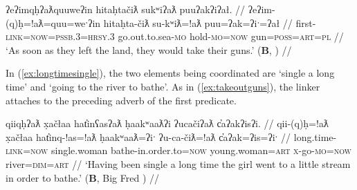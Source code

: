 \ex \label{ex:takeoutguns}
\begingl
\glpreamble ʔeʔimqḥʔaƛquuweʔin hitaḥtačiƛ sukʷiʔaƛ puuʔakʔiʔał. //
\gla ʔeʔim-(q)ḥ=!aƛ=quu=weˑʔin hitaḥta-čiƛ su-kʷiƛ=!aƛ puu=ʔak=ʔiˑ=ʔał //
\glb first-\textsc{link}=\textsc{now}=\textsc{pssb.3}=\textsc{hrsy.3} go.out.to.sea-\textsc{mo} hold-\textsc{mo}=\textsc{now} gun=\textsc{poss}=\textsc{art}=\textsc{pl} //
\glft `As soon as they left the land, they would take their guns.' (\textbf{B}, \citealt[395]{sapir1955}) //
\endgl
\xe

\begin{comment}
In (\ref{stillatwar}), the linker again attaches to an adverb \textit{ʔiiqḥii} `still', and links the entire predicate `still doing war' to the earlier predicate \textit{qʷis} `do thus.'

\ex \label{stillatwar}
\begingl
\glpreamble qiiḥsn̓aakck̓in ʔaḥ qʷiyiič qʷis, [ʔiiqḥii\textbf{qḥ} hitačink maatmaasʔi] [qaḥsaap̓aƛquuweʔin č̓amuʔałʔaƛquu yuułuʔiłʔatqḥ huuʕiiʔatḥuʔałʔaƛquu]]. //
\gla qiiḥsn̓aak-ck̓in ʔaḥ qʷiyi=(y)ii=č [[qʷis] [ʔiiqḥii-\textbf{(q)ḥ} hitačink maatmaas=ʔiˑ]] qaḥ-saˑp=!aƛ=quu=weˑʔin  č̓am-uʔał=!aƛ=quu yuułuʔiłʔatḥ-(q)ḥ huuʕiiʔatḥ-uʔał=!aƛ=quu. //
\glb long.time-\textsc{dim} \textsc{d1} when=\textsc{weak.3}=\textsc{hrsy} do.thus still-\text{link} go.against tribe.\textsc{pl}=\textsc{art} kill-\textsc{mo.caus}=\textsc{now}=\textsc{pssb.3}=\textsc{hrsy.3} canoe-see=\textsc{now}=\textsc{pssb.3} Ucluelet-\textsc{link} Huuayaht-see=\textsc{pssb.3}=\textsc{hrsy.3} //
\glft `For a little longer after this happened, while the tribes were still at war, the Ucluelets would kill Huu-ay-ahts when they saw their canoes.' (\textbf{B}, \citealt[392]{sapir1955}) //
\endgl
\xe
\end{comment}

In (\ref{ex:longtimesingle}), the two elements being coordinated are `single a long time' and `going to the river to bathe'. As in (\ref{ex:takeoutguns}), the linker attaches to the preceding adverb of the first predicate.

\ex \label{ex:longtimesingle}
\begingl
\glpreamble qiiqḥʔaƛ x̣ačłaa hat̓inʕasʔaƛ ḥaakʷaaƛʔi ʔucačiʔaƛ c̓aʔakʔisʔi. //
\gla qii-(q)ḥ=!aƛ x̣ačłaa hat̓inq-!as=!aƛ ḥaakʷaaƛ=ʔiˑ ʔu-ca-čiƛ=!aƛ c̓aʔak=ʔis=ʔiˑ //
\glb long.time-\textsc{link}=\textsc{now} single.woman bathe-in.order.to=\textsc{now} young.woman=\textsc{art} \textsc{x}-go-\textsc{mo}=\textsc{now} river=\textsc{dim}=\textsc{art} //
\glft `Having been single a long time the girl went to a little stream in order to bathe.' (\textbf{B}, Big Fred \citealt[68]{sapir1939}) //
\endgl
\xe

